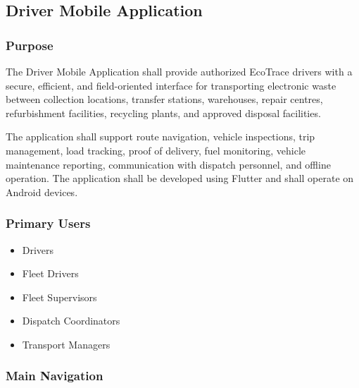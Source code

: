 \subsection{Driver Mobile Application}

\subsubsection*{Purpose}

The Driver Mobile Application shall provide authorized EcoTrace drivers
with a secure, efficient, and field-oriented interface for transporting
electronic waste between collection locations, transfer stations,
warehouses, repair centres, refurbishment facilities, recycling plants,
and approved disposal facilities.

The application shall support route navigation, vehicle inspections,
trip management, load tracking, proof of delivery, fuel monitoring,
vehicle maintenance reporting, communication with dispatch personnel,
and offline operation. The application shall be developed using Flutter
and shall operate on Android devices.


\subsubsection*{Primary Users}

\begin{itemize}

\item Drivers

\item Fleet Drivers

\item Fleet Supervisors

\item Dispatch Coordinators

\item Transport Managers

\end{itemize}


\subsubsection*{Main Navigation}

